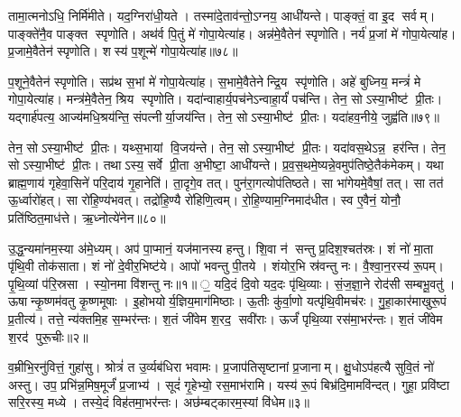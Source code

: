 तामा॒त्मनोऽधि॒ निर्मि॑मीते। यद॒ग्निरा॑धी॒यते। तस्मा॑दे॒ताव॑न्तो॒ऽग्नय॒ आधी॑यन्ते। पाङ्क्तं॒ वा इ॒द सर्वम्। पाङ्क्ते॑नै॒व पाङ्क्त स्पृणोति। अथ॑र्व पि॒तुं मे॑ गोपा॒येत्या॑ह। अन्न॑मे॒वैतेन॑ स्पृणोति। नर्य॑ प्र॒जां मे॑ गोपा॒येत्या॑ह। प्र॒जामे॒वैतेन॑ स्पृणोति। शस्य॑ प॒शून्मे॑ गोपा॒येत्या॑ह॥७८॥

प॒शूने॒वैतेन॑ स्पृणोति। सप्र॑थ स॒भां मे॑ गोपा॒येत्या॑ह। स॒भामे॒वैतेनेन्द्रि॒य स्पृ॑णोति। अहे॑ बुध्निय॒ मन्त्रं॑ मे गोपा॒येत्या॑ह। मन्त्र॑मे॒वैतेन॒ श्रिय स्पृणोति। यदा॑न्वाहार्य॒पच॑नेऽन्वाहा॒र्यं॑ पच॑न्ति। तेन॒ सोऽस्या॒भीष्ट॑ प्री॒तः। यद्गार्\mbox{}ह॑पत्य॒ आज्य॑मधि॒श्रय॑न्ति॒ संपत्नीर्या॒जय॑न्ति। तेन॒ सोऽस्या॒भीष्ट॑ प्री॒तः। यदा॑हव॒नीये॒ जुह्व॑ति॥७९॥

तेन॒ सोऽस्या॒भीष्ट॑ प्री॒तः। यथ्स॒भायां वि॒जय॑न्ते। तेन॒ सोऽस्या॒भीष्ट॑ प्री॒तः। यदा॑वस॒थेऽन्न॒ हर॑न्ति। तेन॒ सोऽस्या॒भीष्ट॑ प्री॒तः। तथाऽस्य॒ सर्वे प्री॒ता अ॒भीष्टा॒ आधी॑यन्ते। प्र॒व॒स॒थमे॒ष्यन्ने॒वमुप॑तिष्ठे॒तैक॑मेकम्। यथा ब्राह्म॒णाय॑ गृहेवा॒सिने॑ परि॒दाय॑ गृ॒हानेति॑। ता॒दृगे॒व तत्। पुन॑रा॒गत्योप॑तिष्ठते। सा भा॑गेयमे॒वैषां॒ तत्। सा तत॑ ऊ॒र्ध्वारो॑हत्। सा रो॑हि॒ण्य॑भवत्। तद्रो॑हि॒ण्यै रो॑हिणि॒त्वम्। रो॒हि॒ण्याम॒ग्निमाद॑धीत। स्व ए॒वैनं॒ योनौ॒ प्रति॑ष्ठित॒माध॑त्ते। ऋ॒ध्नोत्ये॑नेन॥८०॥\anuvakamend[ए॒षा प॒शून्मे॑ गोपा॒येति॒ प्रवि॑ष्टा प॒शून्मे॑ गोपा॒येत्या॑ह॒ जुह्व॑ति तिष्ठते स॒प्त च॑॥१०॥]




\clearpage
{}
\setcounter{anuvakam}{0}
उ॒द्ध॒न्यमा॑नम॒स्या अ॑मे॒ध्यम्। अप॑ पा॒प्मानं॒ यज॑मानस्य हन्तु। शि॒वा न॑ सन्तु प्र॒दिश॒श्चत॑स्रः। शं नो॑ मा॒ता पृ॑थि॒वी तोक॑साता। शं नो॑ दे॒वीर॒भिष्ट॑ये। आपो॑ भवन्तु पी॒तये। शंयोर॒भि स्र॑वन्तु नः। वै॒श्वा॒न॒रस्य॑ रू॒पम्। पृ॒थि॒व्यां प॑रि॒स्रसा। स्यो॒नमा वि॑शन्तु नः॥१॥
॒॒
यदि॒दं दि॒वो यद॒दः पृ॑थि॒व्याः। सं॒ज॒ज्ञा॒ने रोद॑सी सम्बभू॒वतु॑। ऊषान्कृ॒ष्णम॑वतु कृ॒ष्णमूषाः। इ॒होभयोर्य॒ज्ञिय॒माग॑मिष्ठाः। ऊ॒तीः कु॑र्वा॒णो यत्पृ॑थि॒वीमच॑रः। गु॒हा॒कार॑माखुरू॒पं प्र॒तीत्य॑। तत्ते॒ न्य॑क्तमि॒ह स॒म्भर॑न्तः। श॒तं जी॑वेम श॒रद॒ सवी॑राः। ऊर्जं॑ पृथि॒व्या रस॑मा॒भर॑न्तः। श॒तं जी॑वेम श॒रद॑ पुरू॒चीः॥२॥

व॒म्रीभि॒रनु॑वित्तं॒ गुहा॑सु। श्रोत्रं॑ त उ॒र्व्यब॑धिरा भवामः। प्र॒जाप॑तिसृष्टानां प्र॒जानाम्। क्षु॒धोऽप॑हत्यै सुवि॒तं नो॑ अस्तु। उप॒ प्रभि॑न्न॒मिष॒मूर्जं॑ प्र॒जाभ्य॑। सूदं॑ गृ॒हेभ्यो॒ रस॒माभ॑रामि। यस्य॑ रू॒पं बिभ्र॑दि॒मामवि॑न्दत्। गुहा॒ प्रवि॑ष्टा सरि॒रस्य॒ मध्ये। तस्ये॒दं विह॑तमा॒भर॑न्तः। अछ॑म्बट्कारम॒स्यां वि॑धेम॥३॥

